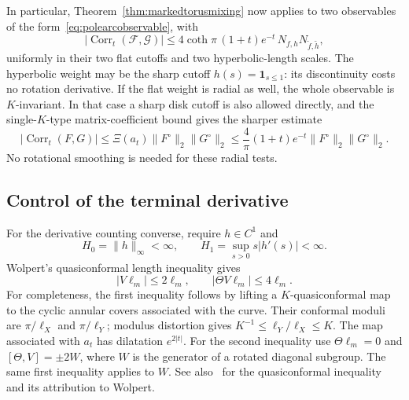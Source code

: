 \documentclass[11pt,a4paper]{article}
\numberwithin{equation}{section}
\theoremstyle{definition}
\theoremstyle{remark}
\begin{document}
In particular, Theorem~\ref{thm:markedtorusmixing} now applies to two
observables of the form~\eqref{eq:polearcobservable}, with
\begin{equation}
 |\operatorname{Corr}_t(\mathcal F,\mathcal G)|
 \leq4\coth\pi\,(1+t)e^{-t}\,N_{f,h}N_{\widetilde f,\widetilde h},
 \label{eq:polearccorrelation}
\end{equation}
uniformly in their two flat cutoffs and two hyperbolic-length scales.
The hyperbolic weight may be the sharp cutoff
$h(s)=\mathbf1_{s\leq1}$: its discontinuity costs no rotation derivative.
If the flat weight is radial as well, the whole observable is
$K$-invariant. In that case a sharp disk cutoff is also allowed directly,
and the single-$K$-type matrix-coefficient bound gives the sharper estimate
\begin{equation}
 |\operatorname{Corr}_t(F,G)|
 \leq\Xi(a_t)\|F^\circ\|_2\|G^\circ\|_2
 \leq\frac4\pi(1+t)e^{-t}\|F^\circ\|_2\|G^\circ\|_2.
 \label{eq:polearcKfixedcorrelation}
\end{equation}
No rotational smoothing is needed for these radial tests.

\subsection{Control of the terminal derivative}
\label{subsec:polearcterminal}

For the derivative counting converse, require $h\in C^1$ and
\[
 H_0=\|h\|_\infty<\infty,\qquad
 H_1=\sup_{s>0}s|h'(s)|<\infty.
\]
Wolpert's quasiconformal length inequality gives
\begin{equation}
 |V\ell_m|\leq2\ell_m,
 \qquad |\Theta V\ell_m|\leq4\ell_m.
 \label{eq:polearclengthderivatives}
\end{equation}
For completeness, the first inequality follows by lifting a
$K$-quasiconformal map to the cyclic annular covers associated with the
curve. Their conformal moduli are $\pi/\ell_X$ and $\pi/\ell_Y$;
modulus distortion gives $K^{-1}\leq\ell_Y/\ell_X\leq K$.
The map associated with $a_t$ has dilatation $e^{2|t|}$.
For the second inequality use $\Theta\ell_m=0$ and
$[\Theta,V]=\pm2W$, where $W$ is the generator of a rotated diagonal
subgroup. The same first inequality applies to $W$.
See also~\cite[Equation~(1.1)]{ShigaHyperbolicQC} for the quasiconformal
inequality and its attribution to Wolpert.
\end{document}
